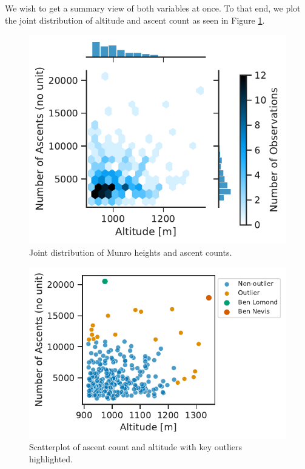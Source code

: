 \documentclass[11pt,a4paper]{article}
\begin{document}
We wish to get a summary view of both variables at once. To that end, we plot the joint distribution of altitude and ascent count as seen in Figure \ref{fds-project-template:fig:heatmap}.
\begin{figure} [h!]
  \centering
  \includegraphics{report/heatmap_joint_distribution.pdf}
  \caption{Joint distribution of Munro heights and ascent counts.}
  \label{fds-project-template:fig:heatmap}
\end{figure}
\begin{figure} [h!]
  \centering
  \includegraphics{report/scatterplot.pdf}
  \caption{Scatterplot of ascent count and altitude with key outliers highlighted.}
  \label{fds-project-template:fig:scatterplot}
\end{figure} \\ \\
\end{document}
